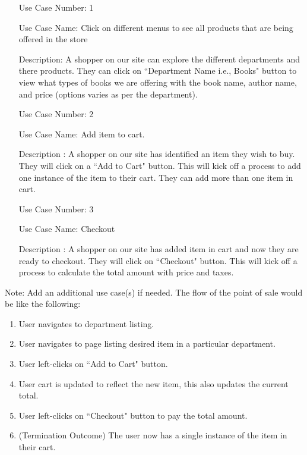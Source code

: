 \documentclass[10pt,conference,onecolumn,compsoc]{IEEEtran}
\begin{document}
\begin{itemize}
\item[Use Case Number:] 1
\item[Use Case Name:] Click on different menus to see all products that are being offered in the store
\item[Description:] A shopper on our site can explore the different departments and there products. They can click on ``Department Name i.e., Books" button to view what types of books we are offering with the book name, author name, and price (options varies as per the department). 
\end{itemize}


\begin{itemize}
\item[Use Case Number:] 2
\item[Use Case Name:] Add item to cart. 
\item[Description]: A shopper on our site has identified an item they wish to buy.  They will click on a ``Add to Cart" button.  This will kick off a process to add one instance of the item to their cart. They can add more than one item in cart. 
\end{itemize}

\begin{itemize}
\item[Use Case Number:] 3
\item[Use Case Name:] Checkout
\item[Description]: A shopper on our site has added item in cart and now they are ready to checkout. They will click on ``Checkout" button. This will kick off a process to calculate the total amount with price and taxes. 
\end{itemize} 
Note: Add an additional use case(s) if needed.
The flow of the point of sale would be like the following:
\begin{enumerate}
\item User navigates to department listing.
\item User navigates to page listing desired item in a particular department.
\item User left-clicks on ``Add to Cart" button.
\item User cart is updated to reflect the new item, this also updates the current total.
\item User left-clicks on ``Checkout" button to pay the total amount.
\item(Termination Outcome) The user now has a single instance of the item in their cart.
\end{enumerate}
\end{document}
